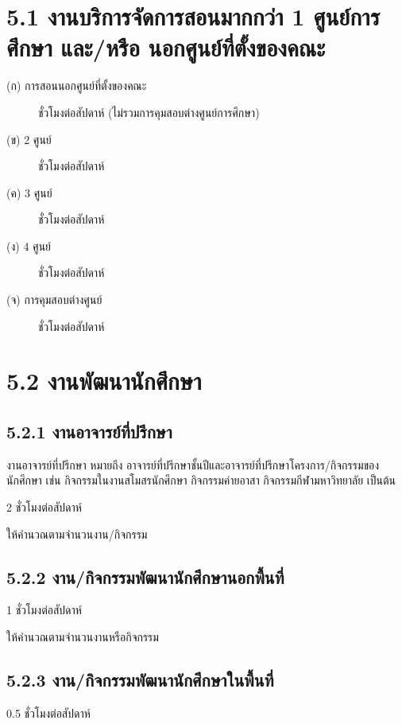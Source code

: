 \documentclass[a4paper,12pt,english]{sphinxmanual}
\begin{document}
\section{5.1 งานบริการจัดการสอนมากกว่า 1 ศูนย์การศึกษา และ/หรือ นอกศูนย์ที่ตั้งของคณะ}
\label{\detokenize{5etc:id4}}\begin{description}
\item[{(ก) การสอนนอกศูนย์ที่ตั้งของคณะ}]  ชั่วโมงต่อสัปดาห์ (ไม่รวมการคุมสอบต่างศูนย์การศึกษา)

\item[{(ข) 2 ศูนย์}]  ชั่วโมงต่อสัปดาห์

\item[{(ค) 3 ศูนย์}]  ชั่วโมงต่อสัปดาห์

\item[{(ง) 4 ศูนย์}]  ชั่วโมงต่อสัปดาห์

\item[{(จ) การคุมสอบต่างศูนย์}]  ชั่วโมงต่อสัปดาห์

\end{description}


\section{5.2 งานพัฒนานักศึกษา}
\label{\detokenize{5etc:id5}}

\subsection{5.2.1 งานอาจารย์ที่ปรึกษา}
\label{\detokenize{5etc:id6}}
งานอาจารย์ที่ปรึกษา หมายถึง อาจารย์ที่ปรึกษาชั้นปีและอาจารย์ที่ปรึกษาโครงการ/กิจกรรมของนักศึกษา เช่น กิจกรรมในงานสโมสรนักศึกษา กิจกรรมค่ายอาสา กิจกรรมกีฬามหาวิทยาลัย เป็นต้น

2 ชั่วโมงต่อสัปดาห์

ให้คำนวณตามจำนวนงาน/กิจกรรม


\subsection{5.2.2 งาน/กิจกรรมพัฒนานักศึกษานอกพื้นที่}
\label{\detokenize{5etc:id7}}
1 ชั่วโมงต่อสัปดาห์

ให้คำนวณตามจำนวนงานหรือกิจกรรม


\subsection{5.2.3 งาน/กิจกรรมพัฒนานักศึกษาในพื้นที่}
\label{\detokenize{5etc:id8}}
0.5 ชั่วโมงต่อสัปดาห์
\end{document}

